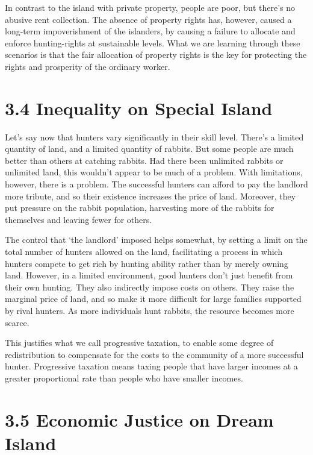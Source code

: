 \documentclass[]{tufte-handout}
\begin{document}
In contrast to the island with private property, people are poor, but
there's no abusive rent collection. The absence of property rights has,
however, caused a long-term impoverishment of the islanders, by causing
a failure to allocate and enforce hunting-rights at sustainable levels.
What we are learning through these scenarios is that the fair allocation
of property rights is the key for protecting the rights and prosperity
of the ordinary worker.

\hypertarget{inequality-on-special-island}{%
\section{3.4 Inequality on Special
Island}\label{inequality-on-special-island}}

Let's say now that hunters vary significantly in their skill level.
There's a limited quantity of land, and a limited quantity of rabbits.
But some people are much better than others at catching rabbits. Had
there been unlimited rabbits or unlimited land, this wouldn't appear to
be much of a problem. With limitations, however, there is a problem. The
successful hunters can afford to pay the landlord more tribute, and so
their existence increases the price of land. Moreover, they put pressure
on the rabbit population, harvesting more of the rabbits for themselves
and leaving fewer for others.

The control that `the landlord' imposed helps somewhat, by setting a
limit on the total number of hunters allowed on the land, facilitating a
process in which hunters compete to get rich by hunting ability rather
than by merely owning land. However, in a limited environment, good
hunters don't just benefit from their own hunting. They also indirectly
impose costs on others. They raise the marginal price of land, and so
make it more difficult for large families supported by rival hunters. As
more individuals hunt rabbits, the resource becomes more scarce.

This justifies what we call progressive taxation, to enable some degree
of redistribution to compensate for the costs to the community of a more
successful hunter. Progressive taxation means taxing people that have
larger incomes at a greater proportional rate than people who have
smaller incomes.

\hypertarget{economic-justice-on-dream-island}{%
\section{3.5 Economic Justice on Dream
Island}\label{economic-justice-on-dream-island}}
\end{document}
